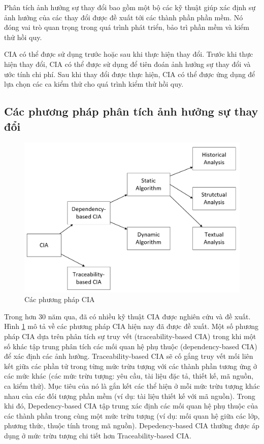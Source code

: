 \documentclass[12pt]{report}
\begin{document}
Phân tích ảnh hưởng sự thay đổi bao gồm một bộ các kỹ thuật giúp xác định sự ảnh hưởng của các thay đổi được đề xuất tới các thành phần phần mềm\cite{cia-survey}. Nó đóng vai trò quan trọng trong quá trình phát triển, bảo trì phần mềm và kiểm thử hồi quy.

CIA có thể được sử dụng trước hoặc sau khi thực hiện thay đổi. Trước khi thực hiện thay đổi, CIA có thể được sử dụng để tiên đoán ảnh hưởng sự thay đổi và ước tính chi phí. Sau khi thay đổi được thực hiện, CIA có thể được ứng dụng để lựa chọn các ca kiểm thử cho quá trình kiểm thử hồi quy.

\subsection{Các phương pháp phân tích ảnh hưởng sự thay đổi}
\begin{figure}[h]
	\centering
	\includegraphics[scale=0.5]{CIA-hierarchy}
	\caption{Các phương pháp CIA}
	\label{fig:cia-hierarchy}
\end{figure}

Trong hơn 30 năm qua, đã có nhiều kỹ thuật CIA được nghiên cứu và đề xuất. Hình \ref{fig:cia-hierarchy} mô tả về các phương pháp CIA hiện nay đã được đề xuất. Một số phương pháp CIA dựa trên phân tích sự truy vết (traceability-based CIA) trong khi một số khác tập trung phân tích các mối quan hệ phụ thuộc (dependency-based CIA) để xác định các ảnh hưởng\cite{cia-bohner}. Traceability-based CIA sẽ cố gắng truy vết mối liên kết giữa các phần tử trong từng mức trừu tượng với các thành phần tương ứng ở các mức khác (các mức trừu tượng: yêu cầu, tài liệu đặc tả, thiết kế, mã nguồn, ca kiểm thử). Mục tiêu của nó là gắn kết các thể hiện ở mỗi mức trừu tượng khác nhau của các đối tượng phần mềm (ví dụ: tài liệu thiết kế với mã nguồn). Trong khi đó, Depedency-based CIA tập trung xác định các mối quan hệ phụ thuộc của các thành phần trong cùng một mức trừu tượng (ví dụ: mối quan hệ giữa các lớp, phương thức, thuộc tính trong mã nguồn). Depedency-based CIA thường được áp dụng ở mức trừu tượng chi tiết hơn Traceability-based CIA.
\end{document}
